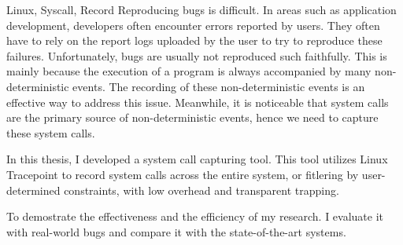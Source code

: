 
\begin{英文摘要}{Linux, Syscall, Record}
    Reproducing bugs is difficult. In areas such as application development,
    developers often encounter errors reported by users. They often have to rely
    on the report logs uploaded by the user to try to reproduce these failures.
    Unfortunately, bugs are usually not reproduced such faithfully. This is
    mainly because the execution of a program is always accompanied by many
    non-deterministic events. The recording of these non-deterministic events is
    an effective way to address this issue. Meanwhile, it is noticeable that
    system calls are the primary source of non-deterministic events, hence we
    need to capture these system calls.
    
    In this thesis, I developed a system call capturing tool. This tool utilizes
    Linux Tracepoint to record system calls across the entire system, or
    fitlering by user-determined constraints, with low overhead and transparent
    trapping. 
    
    To demostrate the effectiveness and the efficiency of my research. I
    evaluate it with real-world bugs and compare it with the state-of-the-art
    systems.
\end{英文摘要}
